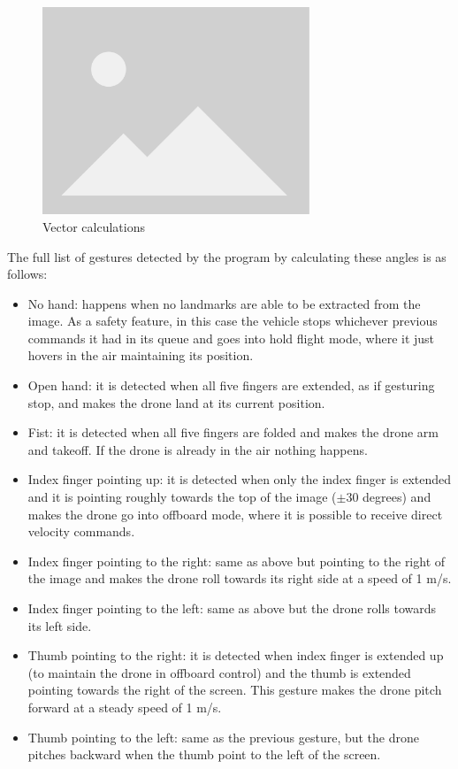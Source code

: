 \begin{figure}
  \centering
  \includegraphics[width=8cm, keepaspectratio]{img/placeholder.png}
  \caption{Vector calculations}
  \label{fig:vector-calcs}
\end{figure}

The full list of gestures detected by the program by calculating these angles is as follows:
\begin{itemize}
    \item No hand: happens when no landmarks are able to be extracted from the image. As a safety feature, in this case the vehicle stops whichever previous commands it had in its queue and goes into hold flight mode, where it just hovers in the air maintaining its position.
    \item Open hand: it is detected when all five fingers are extended, as if gesturing stop, and makes the drone land at its current position.
    \item Fist: it is detected when all five fingers are folded and makes the drone arm and takeoff. If the drone is already in the air nothing happens.
    \item Index finger pointing up: it is detected when only the index finger is extended and it is pointing roughly towards the top of the image ($\pm 30$ degrees) and makes the drone go into offboard mode, where it is possible to receive direct velocity commands.
    \item Index finger pointing to the right: same as above but pointing to the right of the image and makes the drone roll towards its right side at a speed of 1 m/s.
    \item Index finger pointing to the left: same as above but the drone rolls towards its left side.
    \item Thumb pointing to the right: it is detected when index finger is extended up (to maintain the drone in offboard control) and the thumb is extended pointing towards the right of the screen. This gesture makes the drone pitch forward at a steady speed of 1 m/s.
    \item Thumb pointing to the left: same as the previous gesture, but the drone pitches backward when the thumb point to the left of the screen.
\end{itemize}

